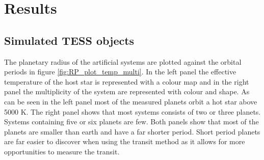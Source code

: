 \documentclass[12pt]{report}
\begin{document}
\chapter{Results}

\section{Simulated TESS objects}
	The planetary radius of the artificial systems are plotted against the orbital periods in figure \ref{fig:RP_plot_temp_multi}. In the left panel the effective temperature of the host star is represented with a colour map and in the right panel the multiplicity of the system are represented with colour and shape. As can be seen in the left panel most of the measured planets orbit a hot star above 5000 K. The right panel shows that most systems consists of two or three planets. Systems containing five or six planets are few. Both panels show that most of the planets are smaller than earth and have a far shorter period. Short period planets are far easier to discover when using the transit method as it allows for more opportunities to measure the transit.
\end{document}

